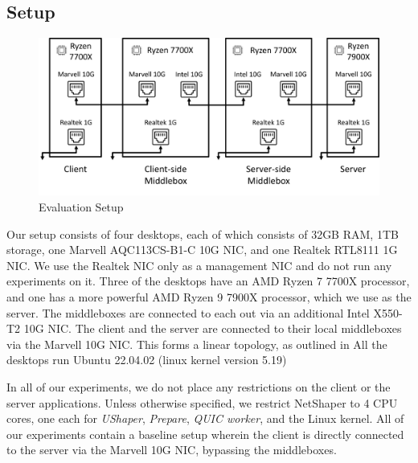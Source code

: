 \subsection{Setup}
\label{subsec:netshaper-evaluation-setup}

\begin{figure}[!htb]
    \centering
    \includegraphics[width=\columnwidth]{figures/netshaper/testbed-setup.png}
    \caption{Evaluation Setup}
    \label{fig:testbed-setup}
\end{figure}

Our setup consists of four desktops, each of which consists of 32GB RAM, 1TB storage, one Marvell AQC113CS-B1-C 10G NIC, and one Realtek RTL8111 1G NIC.
We use the Realtek NIC only as a management NIC and do not run any experiments on it.
Three of the desktops have an AMD Ryzen 7 7700X processor, and one has a more powerful AMD Ryzen 9 7900X processor, which we use as the server.
The middleboxes are connected to each out via an additional Intel X550-T2 10G NIC.
The client and the server are connected to their local middleboxes via the Marvell 10G NIC.
This forms a linear topology, as outlined in 
All the desktops run Ubuntu 22.04.02 (linux kernel version 5.19)

In all of our experiments, we do not place any restrictions on the client or the server applications.
Unless otherwise specified, we restrict NetShaper to 4 CPU cores, one each for \textit{UShaper}, \textit{Prepare}, \textit{QUIC worker}, and the Linux kernel.
All of our experiments contain a baseline setup wherein the client is directly connected to the server via the Marvell 10G NIC, bypassing the middleboxes.

